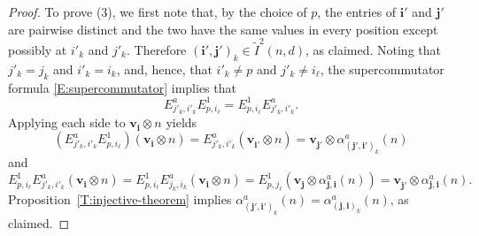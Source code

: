 \documentclass[11pt,reqno]{amsart} %
\newcommand{\0}{\bar{0}}
\newcommand{\1}{\bar{1}}
\newcommand{\bv}{\mathbf{v}}
\newcommand{\bi}{\mathbf{i}}
\newcommand{\bj}{\mathbf{j}}
\newcommand{\Itwo}{\tilde{I}^{2}(n,d)}
\numberwithin{equation}{subsection}
\begin{document}
\begin{proof}
To prove (3), we first note that, by the choice of $p$, the entries of $\bi'$ and $\bj'$ are pairwise distinct and the two have the same values in every position except possibly at $i'_{k}$ and $j'_{k}$.  Therefore $(\bi', \bj')_{k} \in \Itwo$, as claimed.  Noting that $j'_{k}=j_{k}$ and $i'_{k}=i_{k}$, and, hence, that $i'_{k}\neq p$ and $j'_{k}\neq i_{\ell}$, the supercommutator formula \eqref{E:supercommutator} implies that 
\[
E^{a}_{j'_{k},i'_{k}}E_{p,i_{\ell}}^{1} =E_{p,i_{\ell}}^{1}E^{a}_{j'_{k},i'_{k}}.
\] Applying each side to $ \bv_{\bi}^{} \otimes n$ yields
\[
\left(E^{a}_{j'_{k},i'_{k}}E_{p,i_{\ell}}^{1} \right)( \bv_{\bi}^{} \otimes n) = E^{a}_{j'_{k},i'_{k}}( \bv_{\bi'}^{} \otimes n)= \bv_{\bj'}^{} \otimes \alpha_{(\bj', \bi')_{k}}^{a}(n) 
\] and 
\[
E_{p,i_{\ell}}^{1}E^{a}_{j'_{k},i'_{k}}( \bv_{\bi}^{} \otimes n) = E_{p,i_{\ell}}^{1}E^{a}_{j_{k},i_{k}}( \bv_{\bi}^{} \otimes n)=E_{p,j_{\ell}}^{1}\left( \bv_{\bj}^{} \otimes \alpha_{\bj, \bi}^{a} (n) \right) =  \bv_{\bj'}^{} \otimes \alpha_{\bj, \bi}^{a} (n).
\]  Proposition~\ref{T:injective-theorem} implies $\alpha_{(\bj' , \bi')_{k}}^{a} (n) = \alpha_{(\bj, \bi)_{k}}^{a}(n)$, as claimed.
\end{proof}
\end{document}
